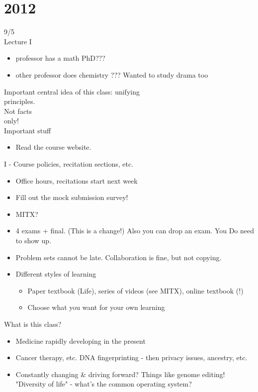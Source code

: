 \documentclass{article}
\begin{document}
 \section{2012}9/5\\
Lecture I
\begin{itemize}
\item  professor has a math PhD???
\item  other professor does chemistry ??? Wanted to study drama too
\end{itemize}
Important central idea of this class: unifying\\
principles.\\
Not facts\\
only!\\
Important stuff
\begin{itemize}
\item  Read the course website.
\end{itemize}
I - Course policies, recitation sections, etc.
\begin{itemize}
\item  Office hours, recitations start next week
\item  Fill out the mock submission survey!
\end{itemize}
\begin{itemize}
\item  MITX?
\end{itemize}
\begin{itemize}
\item 4 exams + final. (This is a change!) Also you can drop an exam.
You Do need to show up.
\end{itemize}
\begin{itemize}
\item  Problem sets cannot be late. Collaboration is fine, but not copying.
\item  Different styles of learning
\begin{itemize}
\item  Paper textbook (Life), series of videos (see MITX), online textbook (!)
\item  Choose what you want for your own learning
\end{itemize}
\end{itemize}
What is this class?
\begin{itemize}
\item  Medicine rapidly developing in the present
\end{itemize}
\begin{itemize}
\item  Cancer therapy, etc.
DNA fingerprinting - then privacy issues, ancestry, etc.
\item  Constantly changing \& driving forward? Things like genome editing!
"Diversity of life" - what's the common operating system?
\end{itemize}
\end{document}
